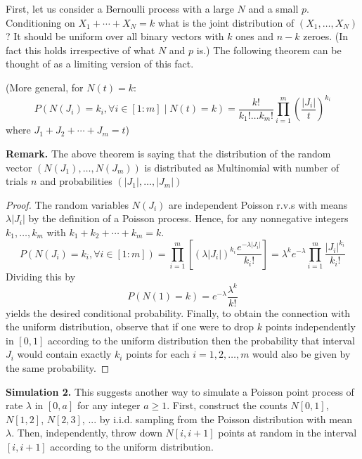 \documentclass[11pt,a4paper]{article}
\newtheorem{theorem}{Theorem}
\begin{document}
First, let us consider a Bernoulli process with a large $N$ and a small $p$. Conditioning on $X_1+\cdots+X_N=k$ what is the joint distribution of $\left(X_1, \ldots, X_N\right)$? It should be uniform over all binary vectors with $k$ ones and $n-k$ zeroes. (In fact this holds irrespective of what $N$ and $p$ is.) The following theorem can be thought of as a limiting version of this fact.
\begin{center}
\end{center}
(More general, for $N(t)=k$: $$
P\left(N\left(J_i\right)=k_i, \forall i \in[1: m] \mid N(t)=k\right)=\frac{k !}{k_{1} ! \ldots k_{m} !} \prod_{i=1}^m\left(\frac{\left|J_i\right|}{t}\right)^{k_i}
$$ where $J_1+J_2+\cdots+J_m=t$)

\textbf{Remark.} The above theorem is saying that the distribution of the random vector $\left(N\left(J_1\right), \ldots, N\left(J_m\right)\right)$ is distributed as Multinomial with number of trials $n$ and probabilities $\left(\left|J_1\right|, \ldots,\left|J_m\right|\right)$
\begin{proof}
    The random variables $N\left(J_i\right)$ are independent Poisson r.v.s with means $\lambda\left|J_i\right|$ by the definition of a Poisson process. Hence, for any nonnegative integers $k_1, \ldots, k_m$ with $k_1+k_2+\cdots+k_m=k$.
    $$
    P\left(N\left(J_i\right)=k_i, \forall i \in[1: m]\right)=\prod_{i=1}^m\left[\left(\lambda\left|J_i\right|\right)^{k_i} \frac{e^{-\lambda\left|J_i\right|}}{k_{i} !}\right]=\lambda^k e^{-\lambda} \prod_{i=1}^m \frac{\left|J_i\right|^{k_i}}{k_{i} !}
    $$
    Dividing this by
    $$
    P(N(1)=k)=e^{-\lambda} \frac{\lambda^k}{k !}
    $$
    yields the desired conditional probability. Finally, to obtain the connection with the uniform distribution, observe that if one were to drop $k$ points independently in $[0,1]$ according to the uniform distribution then the probability that interval $J_i$ would contain exactly $k_i$ points for each $i=1,2, \ldots, m$ would also be given by the same probability.
\end{proof}
\textbf{Simulation 2.} This suggests another way to simulate a Poisson point process of rate $\lambda$ in $[0, a]$ for any integer $a \geq 1$. First, construct the counts $N[0, 1]$, $N[1, 2]$, $N[2, 3]$, ... by i.i.d. sampling from the Poisson distribution with mean $\lambda$. Then, independently, throw down $N [i, i + 1]$ points at random in the interval $[i, i + 1]$ according to the uniform distribution.
\end{document}
